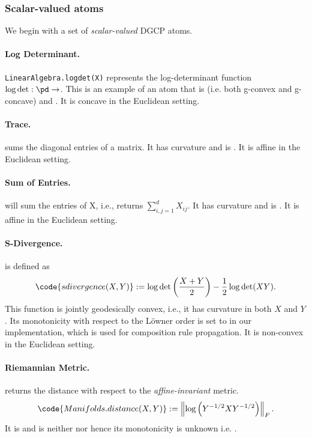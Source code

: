 \documentclass[twoside,11pt]{article}
\begin{document}
\subsubsection{Scalar-valued atoms}
We begin with a set of \textit{scalar-valued} DGCP atoms.
\paragraph{Log Determinant.}
 \texttt{LinearAlgebra.logdet(X)} represents the log-determinant function $\log \det: \pd \to \real$. This is an example of an atom that is  (i.e. both g-convex and g-concave) and . It is concave in the Euclidean setting.
 
\paragraph{Trace.}  sums the diagonal entries of a matrix. It has  curvature and is . It is affine in the Euclidean setting.

\paragraph{Sum of Entries.} 
 will sum the entries of X, i.e., returns $\sum_{i,j=1}^d X_{ij}$. It has  curvature and is . It is affine in the Euclidean setting.  

\paragraph{S-Divergence.}
 is defined as 
\begin{equation}\label{eq:sdiv}
    \code{sdivergence(X,Y)} := \log \det \left( \frac{X+Y}{2} \right) - \frac{1}{2}\log \det (XY).
\end{equation}
This function is jointly geodesically convex, i.e., it has  curvature in both $X$ and $Y$. Its monotonicity with respect to the L\"{o}wner order is set to  in our implementation, which is used for composition rule propagation. It is non-convex in the Euclidean setting.

\paragraph{Riemannian Metric.}
 returns the distance with respect to the \textit{affine-invariant} metric. 
\[
\code{Manifolds.distance(X,Y)} := \left\|\log \left(Y^{-1/2}X Y^{-1/2}\right)\right\|_F.
\] 
It is  and is neither  nor  hence its monotonicity is unknown i.e. .
\end{document}
